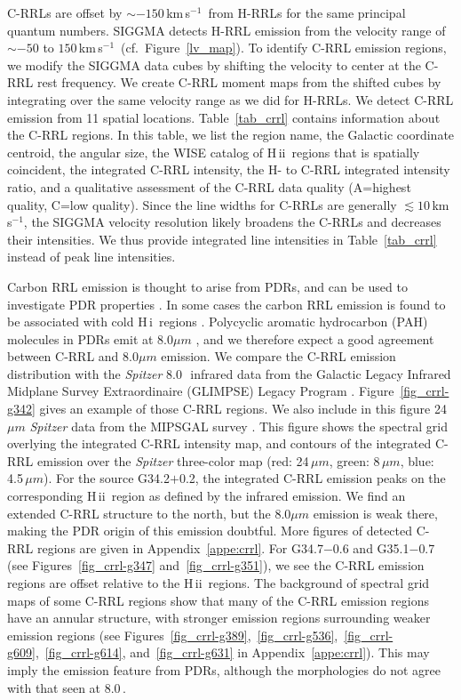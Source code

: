 \documentclass[manuscript]{aastex61}
\newcommand{\hii}{{\rm H\,}{{\sc ii}}}
\newcommand{\hi}{{\rm H\,}{{\sc i}}}
\newcommand{\kms}{\,km\,s$^{-1}$}
\newcommand{\um}{\mu m}
\begin{document}
C-RRLs are offset by $\sim-150$\kms\ from H-RRLs for the same principal quantum numbers.
SIGGMA detects H-RRL emission from the velocity range of $\sim-50$ to $150$\kms\ (cf.~Figure~\ref{lv_map}).
To identify C-RRL emission regions, we modify the SIGGMA data cubes by shifting the velocity to center at the C-RRL rest frequency.
We create C-RRL moment maps from the shifted cubes by integrating over the same velocity range as we did for H-RRLs. We detect C-RRL emission from 11 spatial locations.
Table~\ref{tab_crrl} contains information about the C-RRL regions. 
In this table, we list the region name, the Galactic coordinate centroid, the angular size, the WISE catalog of \hii\ regions that is spatially coincident, the integrated C-RRL intensity, the H- to C-RRL integrated intensity ratio, and a qualitative assessment of the C-RRL data quality (A=highest quality, C=low quality).
Since the line widths for C-RRLs are generally $\lesssim10$\kms, the SIGGMA velocity resolution likely broadens the C-RRLs and decreases their intensities.  We thus provide integrated line intensities in Table~\ref{tab_crrl} instead of peak line intensities.

Carbon RRL emission is thought to arise from PDRs, and can be used to investigate PDR properties \citep[][etc.]{Pankonin1977,Natta1994,Roshi2007}.
In some cases the carbon RRL emission is found to be associated with cold \hi\ regions \citep{Roshi2011}.
Polycyclic aromatic hydrocarbon (PAH) molecules in PDRs emit at 8.0$\um$ \citep{Watson2008,Watson2009}, and we therefore expect a good agreement between C-RRL and 8.0$\um$ emission.
We compare the C-RRL emission distribution with the {\it Spitzer} 8.0\,\micron\ infrared data from the Galactic Legacy Infrared Midplane Survey Extraordinaire (GLIMPSE) Legacy Program \citep{Benjamin2003,Churchwell2009}.
Figure~\ref{fig_crrl-g342} gives an example of those C-RRL regions.
We also include in this figure 24$\um$ {\it Spitzer} data from the MIPSGAL survey \citep{Carey2009, Gutermuth2015}.
This figure shows the spectral grid overlying the integrated C-RRL intensity map, and contours of the integrated C-RRL emission over the {\it Spitzer} three-color map (red: 24\,$\um$, green: 8\,$\um$, blue: 4.5\,$\um$).
For the source G34.2$+$0.2, the integrated C-RRL emission peaks on the corresponding \hii\ region as defined by the infrared emission.
We find an extended C-RRL structure to the north, but the 8.0$\um$ emission is weak there, making the PDR origin of this emission doubtful.
More figures of detected C-RRL regions are given in Appendix~\ref{appe:crrl}.
For G34.7$-$0.6 and G35.1$-$0.7 (see Figures~\ref{fig_crrl-g347} and~\ref{fig_crrl-g351}), we see the C-RRL emission regions are offset relative to the \hii\ regions.
The background of spectral grid maps of some C-RRL regions show that many of the C-RRL emission regions have an annular structure, with stronger emission regions surrounding weaker emission regions (see Figures~\ref{fig_crrl-g389},~\ref{fig_crrl-g536},~\ref{fig_crrl-g609},~\ref{fig_crrl-g614}, and~\ref{fig_crrl-g631} in Appendix~\ref{appe:crrl}).
This may imply the emission feature from PDRs, although the morphologies do not agree with that seen at 8.0\,\micron.
\end{document}
